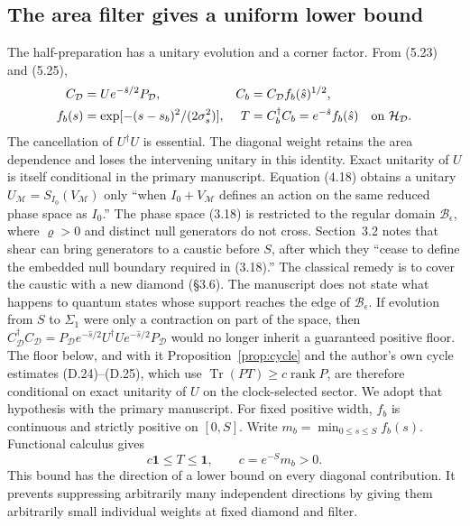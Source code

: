 \documentclass[11pt]{article}
\newcommand{\Tr}{\operatorname{Tr}}
\newcommand{\id}{\mathbf{1}}
\newcommand{\HH}{\mathcal H_{\mathcal D}}
\newcommand{\areaop}{\hat s}
\newcommand{\cD}{C_{\mathcal D}}
\DeclareMathOperator{\rank}{rank}
\begin{document}
\subsection{The area filter gives a uniform lower bound}
The half-preparation has a unitary evolution and a corner factor. From (5.23) and (5.25),
\begin{align}
\cD&=U e^{-\areaop/2}P_{\mathcal D},&
C_b&=\cD f_b(\areaop)^{1/2},\\
f_b(s)&=\exp[-(s-s_b)^2/(2\sigma_s^2)],&
T&=C_b^\dagger C_b=e^{-\areaop}f_b(\areaop)\quad\hbox{on }\HH .
\end{align}
The cancellation of $U^\dagger U$ is essential. The diagonal weight retains the area dependence and loses the intervening unitary in this identity. Exact unitarity of $U$ is itself conditional in the primary manuscript. Equation (4.18) obtains a unitary $U_{\mathcal M}=S_{I_0}(V_{\mathcal M})$ only ``when $I_0+V_{\mathcal M}$ defines an action on the same reduced phase space as $I_0$.'' The phase space (3.18) is restricted to the regular domain $\mathcal B_\epsilon$, where $\varrho>0$ and distinct null generators do not cross. Section~3.2 notes that shear can bring generators to a caustic before $S$, after which they ``cease to define the embedded null boundary required in (3.18).'' The classical remedy is to cover the caustic with a new diamond (\S3.6). The manuscript does not state what happens to quantum states whose support reaches the edge of $\mathcal B_\epsilon$. If evolution from $S$ to $\Sigma_1$ were only a contraction on part of the space, then $C_{\mathcal D}^\dagger C_{\mathcal D}=P_{\mathcal D}e^{-\areaop/2}U^\dagger Ue^{-\areaop/2}P_{\mathcal D}$ would no longer inherit a guaranteed positive floor. The floor below, and with it Proposition~\ref{prop:cycle} and the author's own cycle estimates (D.24)--(D.25), which use $\Tr(PT)\ge c\rank P$, are therefore conditional on exact unitarity of $U$ on the clock-selected sector. We adopt that hypothesis with the primary manuscript. For fixed positive width, $f_b$ is continuous and strictly positive on $[0,S]$. Write $m_b=\min_{0\le s\le S} f_b(s)$. Functional calculus gives
\begin{equation}\label{eq:floor}
c\id\le T\le\id,\qquad c=e^{-S}m_b>0 .
\end{equation}
This bound has the direction of a lower bound on every diagonal contribution. It prevents suppressing arbitrarily many independent directions by giving them arbitrarily small individual weights at fixed diamond and filter.
\end{document}
